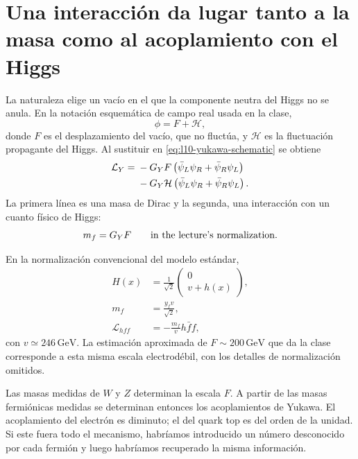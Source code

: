 \section{Una interacción da lugar tanto a la masa como al acoplamiento con el Higgs}

La naturaleza elige un vacío en el que la componente neutra del Higgs no se anula. En la notación esquemática de campo real usada en la clase,
\begin{equation}
  \phi=F+\mathcal H ,
  \label{eq:l10-f-plus-h}
\end{equation}
donde \(F\) es el desplazamiento del vacío, que no fluctúa, y \(\mathcal H\) es la fluctuación propagante del Higgs. Al sustituir en
\eqref{eq:l10-yukawa-schematic} se obtiene
\begin{align}
  \mathcal L_Y
  ={}&
  -G_YF
  \left(\bar\psi_L\psi_R+\bar\psi_R\psi_L\right)
  \notag\\
  &-G_Y\mathcal H
  \left(\bar\psi_L\psi_R+\bar\psi_R\psi_L\right).
  \label{eq:l10-yukawa-split}
\end{align}
La primera línea es una masa de Dirac y la segunda, una interacción con un cuanto físico de Higgs:
\begin{equation}
  m_f=G_YF
  \qquad\hbox{in the lecture's normalization.}
  \label{eq:l10-mass-lecture-normalization}
\end{equation}

En la normalización convencional del modelo estándar,
\begin{equation}
\begin{aligned}
  H(x)&=\frac{1}{\sqrt2}
  \begin{pmatrix}
    0\\ v+h(x)
  \end{pmatrix},
  \\
  m_f&=\frac{y_fv}{\sqrt2},
  \\
  \mathcal L_{hff}&=-\frac{m_f}{v}h\bar f f,
\end{aligned}
  \label{eq:l10-standard-higgs-normalization}
\end{equation}
con \(v\simeq246\,\mathrm{GeV}\). La estimación aproximada de \(F\sim200\,\mathrm{GeV}\) que da la clase corresponde a esta misma escala electrodébil, con los detalles de normalización omitidos.

Las masas medidas de \(W\) y \(Z\) determinan la escala \(F\). A partir de las masas fermiónicas medidas se determinan entonces los acoplamientos de Yukawa. El acoplamiento del electrón es diminuto; el del quark top es del orden de la unidad. Si este fuera todo el mecanismo, habríamos introducido un número desconocido por cada fermión y luego habríamos recuperado la misma información.

